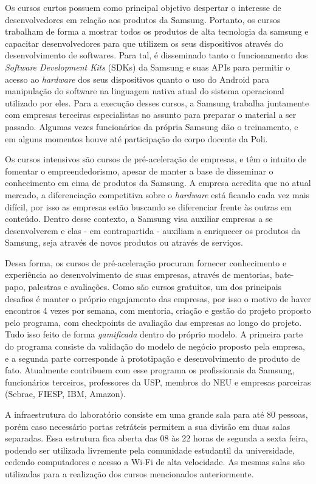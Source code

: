 Os cursos curtos possuem como principal objetivo despertar o interesse de desenvolvedores em relação aos produtos da Samsung. Portanto, os cursos trabalham de forma a mostrar todos os produtos de alta tecnologia da samsung e capacitar desenvolvedores para que utilizem os seus dispositivos através do desenvolvimento de softwares. Para tal, é disseminado tanto o funcionamento dos \textit{Software Development Kits} (SDKs) da Samsung e suas APIs para permitir o acesso ao \textit{hardware} dos seus dispositivos quanto o uso do Android para manipulação do software na linguagem nativa atual do sistema operacional utilizado por eles. Para a execução desses cursos, a Samsung trabalha juntamente com empresas terceiras especialistas no assunto para preparar o material a ser passado. Algumas vezes funcionários da própria Samsung dão o treinamento, e em alguns momentos houve até participação do corpo docente da Poli.

Os cursos intensivos são cursos de pré-aceleração de empresas, e têm o intuito de fomentar o empreendedorismo, apesar de manter a base de disseminar o conhecimento em cima de produtos da Samsung. A empresa acredita que no atual mercado, a diferenciação competitiva sobre o \textit{hardware} está ficando cada vez mais difícil, por isso as empresas estão buscando se diferenciar frente às outras em conteúdo. Dentro desse contexto, a Samsung visa auxiliar empresas a se desenvolverem e elas - em contrapartida - auxiliam a enriquecer os produtos da Samsung, seja através de novos produtos ou através de serviços.

Dessa forma, os cursos de pré-aceleração procuram fornecer conhecimento e experiência ao desenvolvimento de suas empresas, através de mentorias, bate-papo, palestras e avaliações. Como são cursos gratuitos, um dos principais desafios é manter o próprio engajamento das empresas, por isso o motivo de haver encontros 4 vezes por semana, com mentoria, criação e gestão do projeto proposto pelo programa, com checkpoints de avaliação das empresas ao longo do projeto. Tudo isso feito de forma \textit{gamificada} dentro do próprio modelo. A primeira parte do programa consiste da validação do modelo de negócio proposto pela empresa, e a segunda parte corresponde à prototipação e desenvolvimento de produto de fato. Atualmente contribuem com esse programa os profissionais da Samsung, funcionários terceiros, professores da USP, membros do NEU e empresas parceiras (Sebrae, FIESP, IBM, Amazon).

A infraestrutura do laboratório consiste em uma grande sala para até 80 pessoas, porém caso necessário portas retráteis permitem a sua divisão em duas salas separadas. Essa estrutura fica aberta das 08 às 22 horas de segunda a sexta feira, podendo ser utilizada livremente pela comunidade estudantil da universidade, cedendo computadores e acesso a Wi-Fi de alta velocidade. As mesmas salas são utilizadas para a realização dos cursos mencionados anteriormente.

